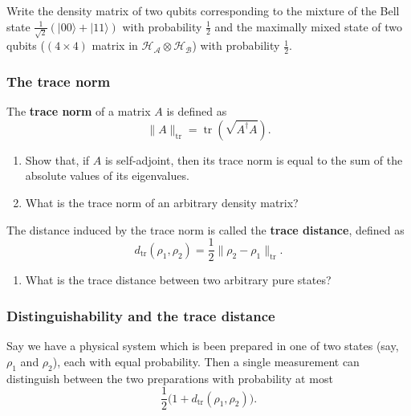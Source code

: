 \documentclass[fleqn]{article}
\providecommand{\tightlist}{%
  \setlength{\itemsep}{0pt}\setlength{\parskip}{0pt}}
\begin{document}
\hypertarget{section-32}{%
\subsubsection{}\label{section-32}}

Write the density matrix of two qubits corresponding to the mixture of the Bell state \(\frac{1}{\sqrt 2}\left(|00\rangle + |11\rangle\right)\) with probability \(\frac12\) and the maximally mixed state of two qubits (\((4\times 4)\) matrix in \(\mathcal{H}_{\mathcal{A}}\otimes\mathcal{H}_{\mathcal{B}}\)) with probability \(\frac12\).

\hypertarget{the-trace-norm}{%
\subsubsection{The trace norm}\label{the-trace-norm}}

The \textbf{trace norm} of a matrix \(A\) is defined as
\[
  \|A\|_{\operatorname{tr}} = \operatorname{tr}\left(\sqrt{A^\dagger A}\right).
\]

\begin{enumerate}
\def\labelenumi{\arabic{enumi}.}
\item
  Show that, if \(A\) is self-adjoint, then its trace norm is equal to the sum of the absolute values of its eigenvalues.
\item
  What is the trace norm of an arbitrary density matrix?
\end{enumerate}

The distance induced by the trace norm is called the \textbf{trace distance}, defined as
\[
  d_{\operatorname{tr}}(\rho_1,\rho_2) = \frac12\|\rho_2-\rho_1\|_{\operatorname{tr}}.
\]

\begin{enumerate}
\def\labelenumi{\arabic{enumi}.}
\setcounter{enumi}{2}
\tightlist
\item
  What is the trace distance between two arbitrary pure states?
\end{enumerate}

\hypertarget{distinguishability-and-the-trace-distance}{%
\subsubsection{Distinguishability and the trace distance}\label{distinguishability-and-the-trace-distance}}

Say we have a physical system which is been prepared in one of two states (say, \(\rho_1\) and \(\rho_2\)), each with equal probability.
Then a single measurement can distinguish between the two preparations with probability at most
\[
  \frac12\big(1+d_{\operatorname{tr}}(\rho_1,\rho_2)\big).
\]
\end{document}
